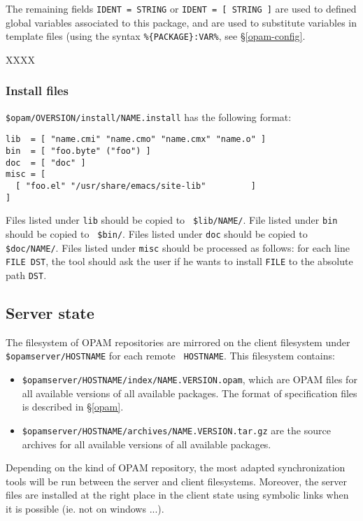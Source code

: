 \documentclass[a4paper,11pt]{article}
\begin{document}
The remaining fields {\tt IDENT = STRING} or {\tt IDENT = [ STRING ]}
are used to defined global variables associated to this package,
and are used to substitute variables in template files (using the
syntax \verb+%{PACKAGE}:VAR%+, see \S\ref{opam-config}.

XXXX


\subsubsection{Install files}
\label{install}

\verb+$opam/OVERSION/install/NAME.install+ has the following format:

\begin{verbatim}
lib  = [ "name.cmi" "name.cmo" "name.cmx" "name.o" ]
bin  = [ "foo.byte" ("foo") ]
doc  = [ "doc" ]
misc = [
  [ "foo.el" "/usr/share/emacs/site-lib"         ]
]
\end{verbatim}

Files listed under {\tt lib} should be copied to {\tt
  \$lib/NAME/}. File listed under {\tt bin} should be copied to {\tt
  \$bin/}. Files listed under {\tt doc} should be copied to {\tt \$doc/NAME/}.
Files listed under {\tt misc} should be processed as
follows: for each line {\tt FILE DST}, the tool should ask the user if
he wants to install {\tt FILE} to the absolute path {\tt DST}.

\subsection{Server state}

The filesystem of OPAM repositories are mirrored on the client
filesystem under {\tt \$opamserver/HOSTNAME} for each remote {\tt
  HOSTNAME}. This filesystem contains:

\begin{itemize}

\item {\tt \$opamserver/HOSTNAME/index/NAME.VERSION.opam}, which are
  OPAM files for all available versions of all available packages. The
  format of specification files is described in \S\ref{opam}.

\item {\tt \$opamserver/HOSTNAME/archives/NAME.VERSION.tar.gz} are the
  source archives for all available versions of all available
  packages.

\end{itemize}

Depending on the kind of OPAM repository, the most adapted
synchronization tools will be run between the server and client
filesystems. Moreover, the server files are installed at the right
place in the client state using symbolic links when it is possible
(ie. not on windows ...).
\end{document}
